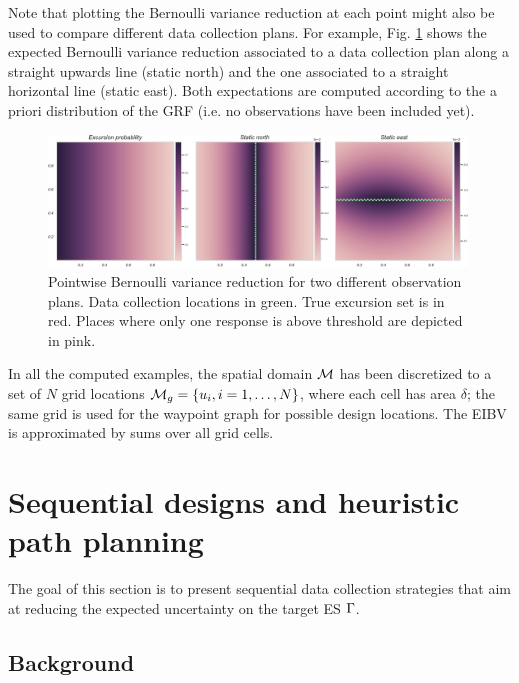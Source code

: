 \documentclass[aoas]{imsart}
\begin{document}
Note that plotting the Bernoulli variance reduction at each point might also be used to compare different data collection plans. For example, Fig. \ref{fig:ebv_north_vs_east} shows the expected Bernoulli variance reduction associated to a data collection plan along a straight upwards line (static north) and the one associated to a straight horizontal line (static east). Both expectations are computed according to the a priori distribution of the GRF (i.e. no observations have been included yet).

\begin{figure}[h!] \centering
  \includegraphics[width=0.99\textwidth]{Figures/ebv_north_vs_east_2.png}
  \caption{Pointwise Bernoulli variance reduction for two different observation plans. Data collection locations in green. True excursion set is in red. Places where only one response is above threshold are depicted in pink.}
\label{fig:ebv_north_vs_east}
\end{figure}

In all the computed examples, the spatial domain $\mathcal{M}$ has been discretized to a set of $N$ grid
locations $\mathcal{M}_g = \{u_i, i=1,\ldots,N \}$, where each cell
has area $\delta$; the same grid is used for the waypoint graph for
possible design locations. The EIBV is approximated by sums over all
grid cells.


\section{Sequential designs and heuristic path planning}\label{sec:heuristics}

The goal of this section is to present sequential data collection strategies that aim at reducing the expected uncertainty on the target ES $\Gamma$.

\subsection{Background}
\end{document}
